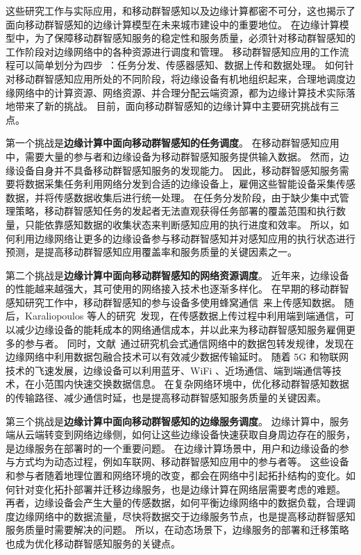 这些研究工作与实际应用，和移动群智感知以及边缘计算都密不可分，这也揭示了面向移动群智感知的边缘计算模型在未来城市建设中的重要地位。
在边缘计算模型中，为了保障移动群智感知服务的稳定性和服务质量，必须针对移动群智感知的工作阶段对边缘网络中的各种资源进行调度和管理。
移动群智感知应用的工作流程可以简单划分为四步~\cite{zh_cn:shi}：任务分发、传感器感知、数据上传和数据处理。
如何针对移动群智感知应用所处的不同阶段，将边缘设备有机地组织起来，合理地调度边缘网络中的计算资源、网络资源、并合理分配云端资源，都为边缘计算技术实际落地带来了新的挑战。
目前，面向移动群智感知的边缘计算中主要研究挑战有三点。

第一个挑战是\textbf{边缘计算中面向移动群智感知的任务调度}。
在移动群智感知应用中，需要大量的参与者和边缘设备为移动群智感知服务提供输入数据。
然而，边缘设备自身并不具备移动群智感知服务的发现能力。
因此，移动群智感知服务需要将数据采集任务利用网络分发到合适的边缘设备上，雇佣这些智能设备采集传感数据，并将传感数据收集后进行统一处理。
在任务分发阶段，由于缺少集中式管理策略，移动群智感知任务的发起者无法直观获得任务部署的覆盖范围和执行数量，只能依靠感知数据的收集状态来判断感知应用的执行进度和效率。
所以，如何利用边缘网络让更多的边缘设备参与移动群智感知并对感知应用的执行状态进行预测，是提高移动群智感知应用覆盖率和服务质量的关键因素之一。

第二个挑战是\textbf{边缘计算中面向移动群智感知的网络资源调度}。
近年来，边缘设备的性能越来越强大，其可使用的网络接入技术也逐渐多样化。
在早期的移动群智感知研究工作中，移动群智感知的参与设备多使用蜂窝通信~\cite{DBLP:conf/globecom/ZhangJLLC16,DBLP:conf/icdcs/XiaoWHHH16}来上传感知数据。
随后，Karaliopoulos 等人的研究~\cite{DBLP:conf/infocom/KaraliopoulosTK15}发现，在传感数据上传过程中利用端到端通信，可以减少边缘设备的能耗成本的网络通信成本，并以此来为移动群智感知服务雇佣更多的参与者。
同时，文献~\cite{DBLP:journals/tpds/ZhaoMTL15}通过研究机会式通信网络中的数据包转发规律，发现在边缘网络中利用数据包融合技术可以有效减少数据传输延时。
随着 5G 和物联网技术的飞速发展，边缘设备可以利用蓝牙、WiFi 、近场通信、端到端通信等技术，在小范围内快速交换数据信息。
在复杂网络环境中，优化移动群智感知数据的传输路径、减少通信时延，也是提高移动群智感知服务质量的关键因素。

第三个挑战是\textbf{边缘计算中面向移动群智感知的边缘服务调度}。
边缘计算中，服务端从云端转变到网络边缘侧，如何让这些边缘设备快速获取自身周边存在的服务，是边缘服务在部署时的一个重要问题。
在边缘计算场景中，用户和边缘设备的参与方式均为动态过程，例如车联网、移动群智感知应用中的参与者等。
这些设备和参与者随着地理位置和网络环境的改变，都会在网络中引起拓扑结构的变化。如何针对变化拓扑部署并迁移边缘服务，也是边缘计算在网络层需要考虑的难题。
再者，边缘设备会产生大量的传感数据，如何平衡边缘网络中的数据负载，合理调度边缘网络中的数据流量，尽快将数据交于边缘服务节点，也是提高移动群智感知服务质量时需要解决的问题。
所以，在动态场景下，边缘服务的部署和迁移策略也成为优化移动群智感知服务的关键点。



